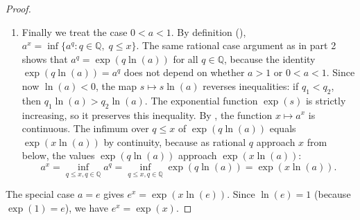 \begin{proof}
\begin{enumerate}
    For general rationals $q = m/n$ with $m \in \mathbb{Z}$ and $n \in \mathbb{N}_{>0}$, we raise $\exp(q \ln(a))$ to the power $n$:
    $$\left(\exp(q \ln(a))\right)^n = \exp(n \cdot q \ln(a)) = \exp(m \ln(a)) = a^m,$$
    where the first equality uses the additivity of $\exp$ applied repeatedly. Since $a^{m/n} = a^q$ is defined as the unique positive real whose $n$-th power equals $a^m$ (), and $\exp(q \ln(a)) > 0$ (because $\exp(t) > 0$ for all $t \in \mathbb{R}$), it follows that $\exp(q \ln(a)) = a^q$.

    Now we extend to irrational $x$. Since $a > 1$, the function $t \mapsto a^t$ on $\mathbb{Q}$ is strictly increasing (by monotonicity of rational exponentiation, ). The map $s \mapsto \exp(s)$ is also strictly increasing because its derivative $\exp'(s) = \exp(s) > 0$ everywhere ( and the fact that exponential values are positive). By , the function $x \mapsto a^x$ is continuous. Since $a^q = \exp(q \ln(a))$ for all $q \in \mathbb{Q}$, and $\exp(x \ln(a))$ is a composition of continuous functions ($x \mapsto x \ln(a)$ followed by $\exp$), both sides agree on the dense subset $\mathbb{Q} \subseteq \mathbb{R}$. By continuity they must agree everywhere:
    $$a^x = \sup_{q \leq x, q \in \mathbb{Q}} a^q = \sup_{q \leq x, q \in \mathbb{Q}} \exp(q \ln(a)) = \exp(x \ln(a)).$$
    The last equality uses the fact that $\exp$ is strictly increasing and continuous, so the supremum of its values over $q \leq x$ equals its value at the limit point $x$.

    \item Finally we treat the case $0 < a < 1$. By definition (), $a^x = \inf\{ a^q : q \in \mathbb{Q},\; q \leq x \}$. The same rational case argument as in part 2 shows that $a^q = \exp(q \ln(a))$ for all $q \in \mathbb{Q}$, because the identity $\exp(q \ln(a)) = a^q$ does not depend on whether $a > 1$ or $0 < a < 1$. Since now $\ln(a) < 0$, the map $s \mapsto s \ln(a)$ reverses inequalities: if $q_1 < q_2$, then $q_1 \ln(a) > q_2 \ln(a)$. The exponential function $\exp(s)$ is strictly increasing, so it preserves this inequality. By , the function $x \mapsto a^x$ is continuous. The infimum over $q \leq x$ of $\exp(q \ln(a))$ equals $\exp(x \ln(a))$ by continuity, because as rational $q$ approach $x$ from below, the values $\exp(q \ln(a))$ approach $\exp(x \ln(a))$:
    $$a^x = \inf_{q \leq x, q \in \mathbb{Q}} a^q = \inf_{q \leq x, q \in \mathbb{Q}} \exp(q \ln(a)) = \exp(x \ln(a)).$$
\end{enumerate}

    The special case $a = e$ gives $e^x = \exp(x \ln(e))$. Since $\ln(e) = 1$ (because $\exp(1) = e$), we have $e^x = \exp(x)$.
\end{proof}
